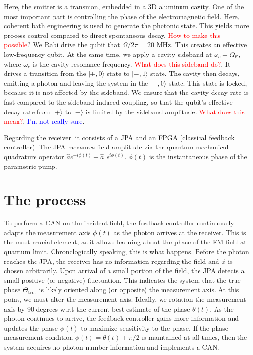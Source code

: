 \documentclass{article}
\begin{document}
Here, the emitter is a transmon, embedded in a 3D aluminum cavity. One of the most important part is controlling the phase of the electromagnetic field. Here, coherent bath engineering is used to generate the photonic state. This yields more process control compared to direct spontaneous decay. \textcolor{red}{How to make this possible}? We Rabi drive the qubit that $\Omega/2\pi = 20$ MHz. This creates an effective low-frequency qubit. At the same time, we apply a cavity sideband at $\omega_{c}+\Omega_R$, where $\omega_c$ is the cavity resonance frequency. \textcolor{red}{What does this sideband do?}. It drives a transition from the $|+, 0\rangle$ state to $|-, 1\rangle$ state. The cavity then decays, emitting a photon and leaving the system in the $|-, 0\rangle$ state. This state is locked, because it is not affected by the sideband. We ensure that the cavity decay rate is fast compared to the sideband-induced coupling, so that the qubit's effective decay rate from $|+\rangle$ to $|-\rangle$ is limited by the sideband amplitude. \textcolor{red}{What does this mean?}. \textcolor{blue}{I'm not really sure}. 

Regarding the receiver, it consists of a JPA and an FPGA (classical feedback controller). The JPA measures field amplitude via the quantum mechanical quadrature operator $\hat{a}e^{-i\phi(t)}+\hat{a}^\dagger e^{i\phi(t)}$. $\phi(t)$ is the instantaneous phase of the parametric pump. 

\section{The process}
To perform a CAN on the incident field, the feedback controller continuously adapts the measurement axis $\phi(t)$ as the photon arrives at the receiver. This is the most crucial element, as it allows learning about the phase of the EM field at quantum limit. Chronologically speaking, this is what happens. Before the photon reaches the JPA, the receiver has no information regarding the field and $\phi$ is chosen arbitrarily. Upon arrival of a small portion of the field, the JPA detects a small positive (or negative) fluctuation. This indicates the system that the true phase $\Theta_{\text{true}}$ is likely oriented along (or opposite) the measurement axis. At this point, we must alter the measurement axis. Ideally, we rotation the measurement axis by 90 degrees w.r.t the current best estimate of the phase $\theta(t)$. As the photon continues to arrive, the feedback controller gains more information and updates the phase $\phi(t)$ to maximize sensitivity to the phase. If the phase measurement condition $\phi(t) = \theta(t) + \pi/2$ is maintained at all times, then the system acquires no photon number information and implements a CAN. 


\end{document}
